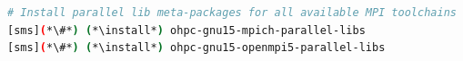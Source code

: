 
\begin{lstlisting}[language=bash,keywords={},upquote=true,keepspaces]
# Install parallel lib meta-packages for all available MPI toolchains
[sms](*\#*) (*\install*) ohpc-gnu15-mpich-parallel-libs
[sms](*\#*) (*\install*) ohpc-gnu15-openmpi5-parallel-libs
\end{lstlisting}

